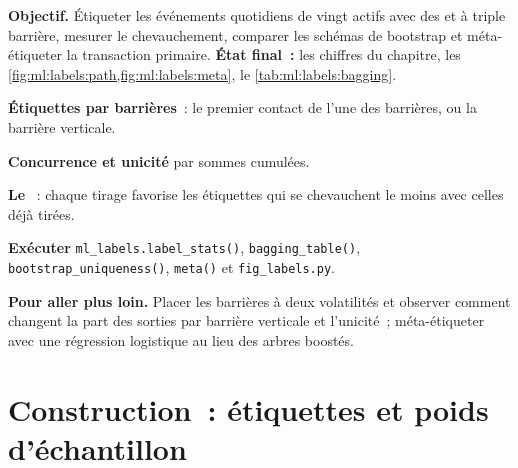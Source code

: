\begin{tutorial}
\textbf{Objectif.} Étiqueter les événements quotidiens de vingt actifs avec des  et à triple barrière, mesurer le chevauchement, comparer
les schémas de bootstrap et méta-étiqueter la transaction primaire. \textbf{État final~:} les chiffres du chapitre,
les \cref{fig:ml:labels:path,fig:ml:labels:meta}, le \cref{tab:ml:labels:bagging}.
\begin{tutsteps}
\item \textbf{Étiquettes par barrières}~: le premier contact de l'une des barrières, ou la barrière verticale.
\label{lst:ml:labels:triple}
\item \textbf{Concurrence et unicité} par sommes cumulées.
\label{lst:ml:labels:uniq}
\item \textbf{Le }~: chaque tirage favorise les étiquettes qui se chevauchent le moins avec celles déjà tirées.
\label{lst:ml:labels:seq}
\item \textbf{Exécuter} \texttt{ml\_labels.label\_stats()}, \texttt{bagging\_table()}, \texttt{bootstrap\_uniqueness()},
\texttt{meta()} et \texttt{fig\_labels.py}.
\end{tutsteps}
\textbf{Pour aller plus loin.} Placer les barrières à deux volatilités et observer comment changent la part des sorties par barrière verticale
et l'unicité~; méta-étiqueter avec une régression logistique au lieu des arbres boostés.
\end{tutorial}

\section{Construction~: étiquettes et poids d'échantillon}\label{bld:ml:targets-labels-and-sample-weights:labeling}

